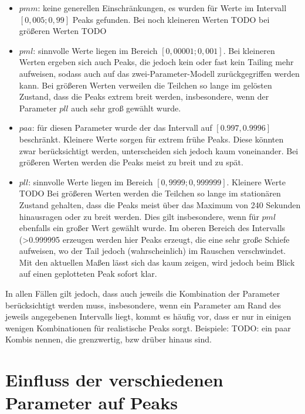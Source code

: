\begin{itemize}
 \item $pmm$: keine generellen Einschränkungen, es wurden für Werte im Intervall $[0,005; 0,99]$ Peaks gefunden. Bei noch kleineren Werten TODO bei größeren Werten TODO
 \item $pml$: sinnvolle Werte liegen im Bereich $[0,00001; 0,001]$. Bei kleineren Werten ergeben sich auch Peaks, die jedoch kein oder fast kein Tailing mehr aufweisen, sodass auch auf das zwei-Parameter-Modell zurückgegriffen werden kann. Bei größeren Werten verweilen die Teilchen so lange im gelösten Zustand, dass die Peaks extrem breit werden, insbesondere, wenn der Parameter $pll$ auch sehr groß gewählt wurde.
 \item $paa$: für diesen Parameter wurde der das Intervall auf $[0.997, 0.9996]$ beschränkt. Kleinere Werte sorgen für extrem frühe Peaks. Diese könnten zwar berücksichtigt werden, unterscheiden sich jedoch kaum voneinander. Bei größeren Werten werden die Peaks meist zu breit und zu spät. 
 \item $pll$: sinnvolle Werte liegen im Bereich $[0,9999; 0,999999]$. Kleinere Werte TODO Bei größeren Werten werden die Teilchen so lange im stationären Zustand gehalten, dass die Peaks meist über das Maximum von 240 Sekunden hinausragen oder zu breit werden. Dies gilt insbesondere, wenn für $pml$ ebenfalls ein großer Wert gewählt wurde. Im oberen Bereich des Intervalls (>0.999995 erzeugen werden hier Peaks erzeugt, die eine sehr große Schiefe aufweisen, wo der Tail jedoch (wahrscheinlich) im Rauschen verschwindet. Mit den aktuellen Maßen lässt sich das kaum zeigen, wird jedoch beim Blick auf einen geplotteten Peak sofort klar.
\end{itemize}

In allen Fällen gilt jedoch, dass auch jeweils die Kombination der Parameter berücksichtigt werden muss, insbesondere, wenn ein Parameter am Rand des jeweils angegebenen Intervalls liegt, kommt es häufig vor, dass er nur in einigen wenigen Kombinationen für realistische Peaks sorgt.
Beispiele: TODO: ein paar Kombis nennen, die grenzwertig, bzw drüber hinaus sind.



\section{Einfluss der verschiedenen Parameter auf Peaks}

